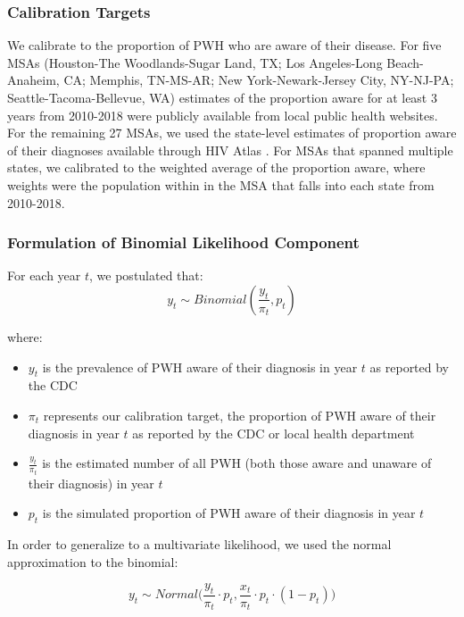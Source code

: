 \documentclass{article}
\begin{document}
\subsubsection{Calibration Targets}
We calibrate to the proportion of PWH who are aware of their disease. For five MSAs (Houston-The Woodlands-Sugar Land, TX; Los Angeles-Long Beach-Anaheim, CA; Memphis, TN-MS-AR; New York-Newark-Jersey City, NY-NJ-PA; Seattle-Tacoma-Bellevue, WA) estimates of the proportion aware for at least 3 years from 2010-2018 were publicly available from local public health websites. For the remaining 27 MSAs, we used the state-level estimates of proportion aware of their diagnoses available through HIV Atlas \cite{hivatlas}. For MSAs that spanned multiple states, we calibrated to the weighted average of the proportion aware, where weights were the population within in the MSA that falls into each state from 2010-2018.

\subsubsection{Formulation of Binomial Likelihood Component}

For each year $t$, we postulated that:
\begin{equation}
	y_t \sim Binomial(\frac{y_t}{\pi_t}, p_t)
\end{equation}

where:
\begin{itemize}
	\item $y_t$ is the prevalence of PWH aware of their diagnosis in year $t$ as reported by the CDC
	\item $\pi_t$ represents our calibration target, the proportion of PWH aware of their diagnosis in year $t$ as reported by the CDC or local health department
	\item $\frac{y_t}{\pi_t}$ is the estimated number of all PWH (both those aware and unaware of their diagnosis) in year $t$
	\item $p_t$ is the simulated proportion of PWH aware of their diagnosis in year $t$
\end{itemize}

In order to generalize to a multivariate likelihood, we used the normal approximation to the binomial:

\begin{equation}
	y_t \sim Normal\Big(\frac{y_t}{\pi_t} \cdot p_t, \frac{x_t}{\pi_t} \cdot p_t \cdot (1 - p_t)\Big)
\end{equation}
\end{document}
